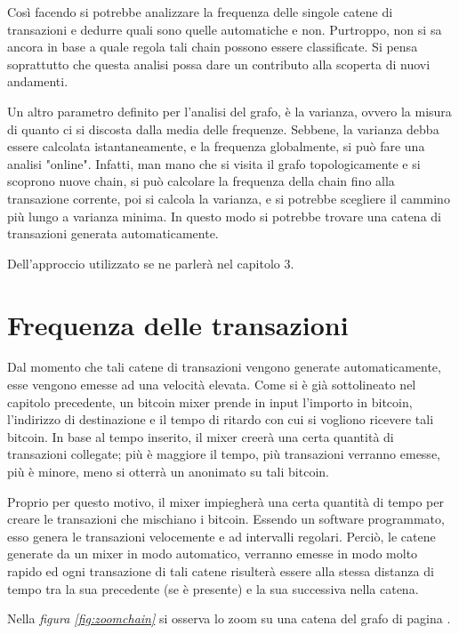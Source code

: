 Così facendo si potrebbe analizzare la frequenza delle singole catene di transazioni e dedurre quali sono quelle automatiche e non. Purtroppo, non si sa ancora in base a quale regola tali chain possono essere classificate. Si pensa soprattutto che questa analisi possa dare un contributo alla scoperta di nuovi andamenti.

Un altro parametro definito per l'analisi del grafo, è la varianza, ovvero la misura di quanto ci si discosta dalla media delle frequenze. Sebbene, la varianza debba essere calcolata istantaneamente, e la frequenza globalmente, si può fare una analisi "online". Infatti, man mano che si visita il grafo topologicamente e si scoprono nuove chain, si può calcolare la frequenza della chain fino alla transazione corrente, poi si calcola la varianza, e si potrebbe scegliere il cammino più lungo a varianza minima. In questo modo si potrebbe trovare una catena di transazioni generata automaticamente.

Dell'approccio utilizzato se ne parlerà nel capitolo 3.

\section{Frequenza delle transazioni}

Dal momento che tali catene di transazioni vengono generate automaticamente, esse vengono emesse ad una velocità elevata. Come si è già sottolineato nel capitolo precedente, un bitcoin mixer prende in input l'importo in bitcoin, l'indirizzo di destinazione e il tempo di ritardo con cui si vogliono ricevere tali bitcoin. In base al tempo inserito, il mixer creerà una certa quantità di transazioni collegate; più è maggiore il tempo, più transazioni verranno emesse, più è minore, meno si otterrà un anonimato su tali bitcoin.

Proprio per questo motivo, il mixer impiegherà una certa quantità di tempo per creare le transazioni che mischiano i bitcoin. Essendo un software programmato, esso genera le transazioni velocemente e ad intervalli regolari. Perciò, le catene generate da un mixer in modo automatico, verranno emesse in modo molto rapido ed ogni transazione di tali catene risulterà essere alla stessa distanza di tempo tra la sua precedente (se è presente) e la sua successiva nella catena.

Nella \textit{figura \ref{fig:zoomchain}} si osserva lo zoom su una catena del grafo di pagina \pageref*{fig:txgraph}.

